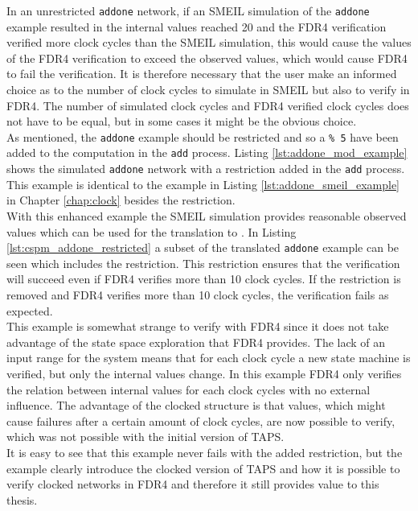 In an unrestricted \texttt{addone} network, if an SMEIL simulation of the \texttt{addone} example resulted in the internal values reached 20 and the FDR4 verification verified more clock cycles than the SMEIL simulation, this would cause the values of the FDR4 verification to exceed the observed values, which would cause FDR4 to fail the verification. It is therefore necessary that the user make an informed choice as to the number of clock cycles to simulate in SMEIL but also to verify in FDR4. The number of simulated clock cycles and FDR4 verified clock cycles does not have to be equal, but in some cases it might be the obvious choice. \\

As mentioned, the \texttt{addone} example should be restricted and so a \texttt{\% 5} have been added to the computation in the \texttt{add} process. Listing \ref{lst:addone_mod_example} shows the simulated  \texttt{addone} network with a restriction added in the \texttt{add} process. This example is identical to the example in Listing \ref{lst:addone_smeil_example} in Chapter \ref{chap:clock} besides the restriction. \\

With this enhanced example the SMEIL simulation provides reasonable observed values which can be used for the translation to \cspm{}. In Listing \ref{lst:cspm_addone_restricted} a subset of the translated \texttt{addone} example can be seen which includes the restriction.
This restriction ensures that the verification will succeed even if FDR4 verifies more than 10 clock cycles. If the restriction is removed and FDR4 verifies more than 10 clock cycles, the verification fails as expected. \\

This example is somewhat strange to verify with FDR4 since it does not take advantage of the state space exploration that FDR4 provides. The lack of an input range for the system means that for each clock cycle a new state machine is verified, but only the internal values change. In this example FDR4 only verifies the relation between internal values for each clock cycles with no external influence. The advantage of the clocked structure is that values, which might cause failures after a certain amount of clock cycles, are now possible to verify, which was not possible with the initial version of TAPS. \\

It is easy to see that this example never fails with the added restriction, but the example clearly introduce the clocked version of TAPS and how it is possible to verify clocked networks in FDR4 and therefore it still provides value to this thesis.

